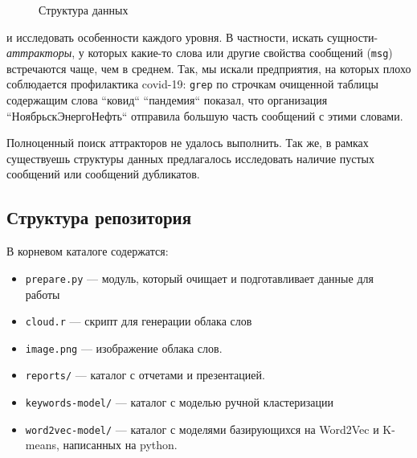 \documentclass{article}
\begin{document}
\begin{figure}[h!]
    \centering
    \caption{Структура данных}
    \label{fig:structure}
\end{figure}

и исследовать особенности каждого уровня. В частности, искать сущности-\textit{аттракторы}, у которых какие-то слова или другие свойства сообщений (\texttt{msg}) встречаются чаще, чем в среднем. Так, мы искали предприятия, на которых плохо соблюдается профилактика covid-19: \texttt{grep} по строчкам очищенной таблицы содержащим слова ``ковид`` ``пандемия`` показал, что организация ``НоябрьскЭнергоНефть`` отправила большую часть сообщений с этими словами.

Полноценный поиск аттракторов не удалось выполнить. Так же, в рамках существуешь структуры данных предлагалось исследовать наличие пустых сообщений или сообщений дубликатов.


\subsection{Структура репозитория}
В корневом каталоге содержатся:
\begin{itemize}
    \item \texttt{prepare.py} --- модуль, который очищает и подготавливает данные для работы
    \item \texttt{cloud.r} --- скрипт для генерации облака слов
    \item \texttt{image.png} --- изображение облака слов.
    \item \texttt{reports/} --- каталог с отчетами и презентацией.
    \item \texttt{keywords-model/} --- каталог с моделью ручной кластеризации
    \item \texttt{word2vec-model/} --- каталог с моделями базирующихся на Word2Vec и K-means, написанных на python.
\end{itemize}
\end{document}
